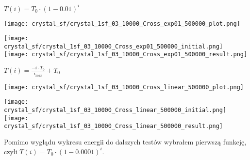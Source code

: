 \begin{minipage}{\textwidth}
$T(i) = T_0\cdot(1-0.01)^{i}$\\
\begin{minipage}{.7\linewidth}
  \texttt{[image: crystal\_sf/crystal\_1sf\_03\_10000\_Cross\_exp01\_500000\_plot.png]}
\end{minipage}%
\begin{minipage}{.3\linewidth}
  \texttt{[image: crystal\_sf/crystal\_1sf\_03\_10000\_Cross\_exp01\_500000\_initial.png]}
  \texttt{[image: crystal\_sf/crystal\_1sf\_03\_10000\_Cross\_exp01\_500000\_result.png]}
\end{minipage}
\end{minipage}

\begin{minipage}{\textwidth}
$T(i) = \frac{-i\cdot T_0}{i_{max}} + T_0$\\
\begin{minipage}{.7\linewidth}
  \texttt{[image: crystal\_sf/crystal\_1sf\_03\_10000\_Cross\_linear\_500000\_plot.png]}
\end{minipage}%
\begin{minipage}{.3\linewidth}
  \texttt{[image: crystal\_sf/crystal\_1sf\_03\_10000\_Cross\_linear\_500000\_initial.png]}
  \texttt{[image: crystal\_sf/crystal\_1sf\_03\_10000\_Cross\_linear\_500000\_result.png]}
\end{minipage}
\end{minipage}

Pomimo wyglądu wykresu energii do dalszych testów wybrałem pierwszą funkcję, czyli
$T(i) = T_0\cdot(1-0.0001)^{i}$.